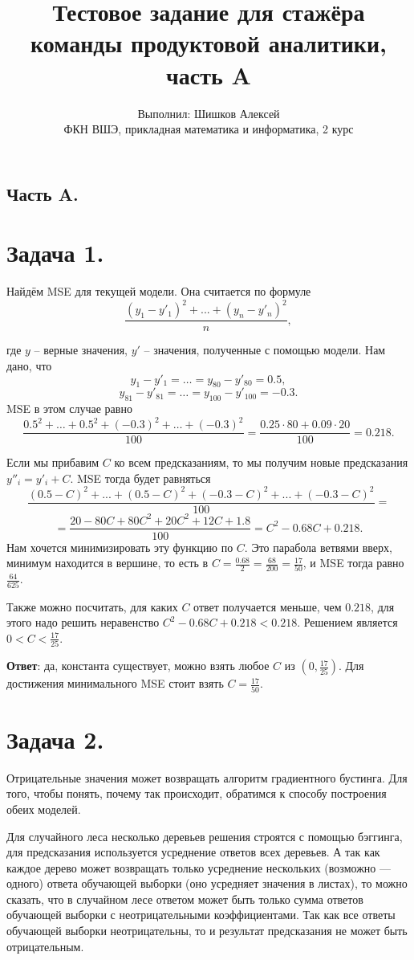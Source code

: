 \documentclass[a4paper, 12pt]{article}
\title{Тестовое задание для стажёра команды продуктовой аналитики, часть A}
\author{Выполнил: Шишков Алексей\\ФКН ВШЭ, прикладная математика и информатика, 2 курс}
\date{}
\renewcommand{\l}{\left(}
\renewcommand{\r}{\right)}
\newcommand{\z}[1]{\section*{Задача #1.}}
\begin{document}
\maketitle

\begin{center}
\section*{Часть A.}
\end{center}

\z 1

Найдём MSE для текущей модели. Она считается по формуле $$\frac{(y_1 - y'_1) ^ 2 + ... + (y_n - y'_n) ^ 2}{n},$$ 

где $y$ -- верные значения, $y'$ -- значения, полученные с помощью модели. Нам дано, что $$y_1 - y'_1 = \ldots = y_{80} - y'_{80} = 0.5,$$ $$ y_{81} - y'_{81} = \ldots = y_{100} - y'_{100} = -0.3.$$ MSE в этом случае равно $$\frac{0.5 ^ 2 + \ldots + 0.5^2 + (-0.3)^2 + \ldots + (-0.3)^2} {100} =\frac{ 0.25 \cdot 80 + 0.09 \cdot 20}{100} = 0.218.$$

Если мы прибавим $C$ ко всем предсказаниям, то мы получим новые предсказания \linebreak $y''_i = y'_i + C$. MSE тогда будет равняться $$\frac{(0.5 - C) ^ 2 + ... + (0.5 - C)^2 + (-0.3 - C)^2 + ... + (-0.3 - C)^2}{100} =$$ $$= \frac{20 - 80C + 80C^2 + 20C^2 + 12C + 1.8} {100} = C^2 - 0.68C + 0.218.$$ Нам хочется минимизировать эту функцию по $C$. Это парабола ветвями вверх, минимум находится в вершине, то есть в $C = \frac{0.68}{2}  = \frac{68}{200}= \frac{17}{50}$, и MSE тогда равно $\frac{64}{625}$.

Также можно посчитать, для каких $C$ ответ получается меньше, чем $0.218$, для этого надо решить неравенство $C^2 - 0.68C + 0.218 < 0.218$. Решением является $0 < C < \frac{17}{25}$.

\textbf{Ответ}: да, константа существует, можно взять любое $C$ из $\l0, \frac{17}{25}\r$. Для достижения минимального MSE стоит взять $C = \frac{17}{50}$.


\z 2

Отрицательные значения может возвращать алгоритм градиентного бустинга. Для того, чтобы понять, почему так происходит, обратимся к способу построения обеих моделей.

Для случайного леса несколько деревьев решения строятся с помощью бэггинга, для предсказания используется усреднение ответов всех деревьев. А так как каждое дерево может возвращать только усреднение нескольких (возможно --- одного) ответа обучающей выборки (оно усредняет значения в листах), то можно сказать, что в случайном лесе ответом может быть только сумма ответов обучающей выборки с неотрицательными коэффициентами. Так как все ответы обучающей выборки неотрицательны, то и результат предсказания не может быть отрицательным.
\end{document}
